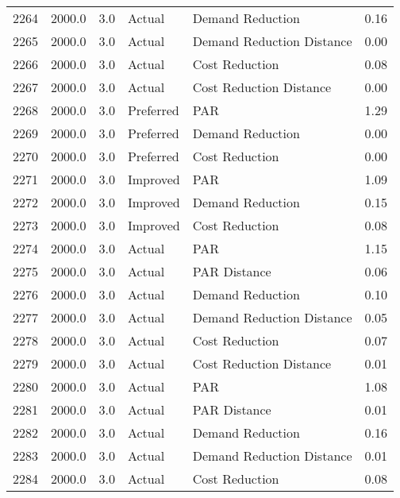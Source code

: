 \begin{longtable}{lrrllr}
2264 &       2000.0 &     3.0 &         Actual &           Demand Reduction &   0.16 \\
2265 &       2000.0 &     3.0 &         Actual &  Demand Reduction Distance &   0.00 \\
2266 &       2000.0 &     3.0 &         Actual &             Cost Reduction &   0.08 \\
2267 &       2000.0 &     3.0 &         Actual &    Cost Reduction Distance &   0.00 \\
2268 &       2000.0 &     3.0 &      Preferred &                        PAR &   1.29 \\
2269 &       2000.0 &     3.0 &      Preferred &           Demand Reduction &   0.00 \\
2270 &       2000.0 &     3.0 &      Preferred &             Cost Reduction &   0.00 \\
2271 &       2000.0 &     3.0 &       Improved &                        PAR &   1.09 \\
2272 &       2000.0 &     3.0 &       Improved &           Demand Reduction &   0.15 \\
2273 &       2000.0 &     3.0 &       Improved &             Cost Reduction &   0.08 \\
2274 &       2000.0 &     3.0 &         Actual &                        PAR &   1.15 \\
2275 &       2000.0 &     3.0 &         Actual &               PAR Distance &   0.06 \\
2276 &       2000.0 &     3.0 &         Actual &           Demand Reduction &   0.10 \\
2277 &       2000.0 &     3.0 &         Actual &  Demand Reduction Distance &   0.05 \\
2278 &       2000.0 &     3.0 &         Actual &             Cost Reduction &   0.07 \\
2279 &       2000.0 &     3.0 &         Actual &    Cost Reduction Distance &   0.01 \\
2280 &       2000.0 &     3.0 &         Actual &                        PAR &   1.08 \\
2281 &       2000.0 &     3.0 &         Actual &               PAR Distance &   0.01 \\
2282 &       2000.0 &     3.0 &         Actual &           Demand Reduction &   0.16 \\
2283 &       2000.0 &     3.0 &         Actual &  Demand Reduction Distance &   0.01 \\
2284 &       2000.0 &     3.0 &         Actual &             Cost Reduction &   0.08 \\

\end{longtable}
